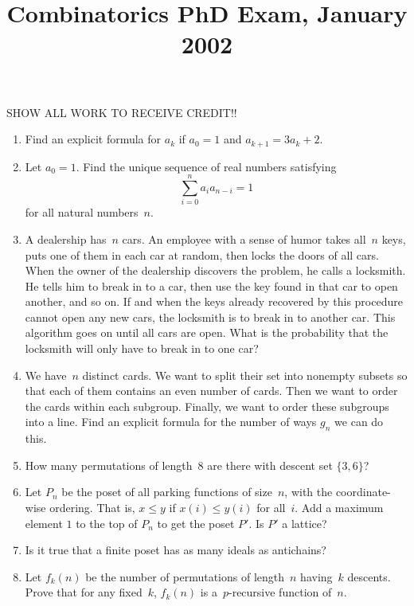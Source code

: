 \documentclass[11pt,letterpaper]{article}
\title{Combinatorics PhD Exam, January 2002}
\author{}
\date{}
\newenvironment{examproblems}[2]{%
  \def\ProblemHeadingTag{#2}%
  \AssignTaggingSocketPlug{block/list/label}{examproblem}%
  \begin{enumerate}%
  \setcounter{enumi}{#1}%
  \renewcommand{\labelenumi}{\textbf{\theenumi.}}%
  \setlength{\topsep}{0.35em}%
  \setlength{\partopsep}{0pt}%
  \setlength{\itemsep}{0.48em}%
  \setlength{\parsep}{0.18em}%
}{\end{enumerate}}
\newenvironment{examinstructions}{%
  \par\begingroup\itshape
}{%
  \par\endgroup\vspace{0.18em}
}
\begin{document}
\maketitle
\thispagestyle{empty}
\begin{examinstructions}
SHOW ALL WORK TO RECEIVE CREDIT!!
\end{examinstructions}
\begin{examproblems}{0}{H2}
\def\ProblemHeadingText{Problem 1.}
\item
Find an explicit formula for \(a_k\) if \(a_0=1\) and \(a_{k+1}=3a_k+2\).
\def\ProblemHeadingText{Problem 2.}
\item
Let \(a_0=1\). Find the unique sequence of real numbers satisfying
\[
\sum_{i=0}^{n} a_i a_{n-i}=1
\]
 for all natural numbers~\(n\).
\def\ProblemHeadingText{Problem 3.}
\item
A dealership has~\(n\) cars. An employee with a sense of humor takes all~\(n\) keys, puts one of them in each car at random, then locks the doors of all cars. When the owner of the dealership discovers the problem, he calls a locksmith. He tells him to break in to a car, then use the key found in that car to open another, and so on. If and when the keys already recovered by this procedure cannot open any new cars, the locksmith is to break in to another car. This algorithm goes on until all cars are open. What is the probability that the locksmith will only have to break in to one car?
\def\ProblemHeadingText{Problem 4.}
\item
We have~\(n\) distinct cards. We want to split their set into nonempty subsets so that each of them contains an even number of cards. Then we want to order the cards within each subgroup. Finally, we want to order these subgroups into a line. Find an explicit formula for the number of ways \(g_n\) we can do this.
\def\ProblemHeadingText{Problem 5.}
\item
How many permutations of length~\(8\) are there with descent set \(\{3,6\}\)?
\def\ProblemHeadingText{Problem 6.}
\item
Let \(P_n\) be the poset of all parking functions of size~\(n\), with the coordinate-wise ordering. That is, \(x\leq y\) if \(x(i)\leq y(i)\) for all~\(i\). Add a maximum element \(\hat{1}\) to the top of \(P_n\) to get the poset \(P'\). Is \(P'\) a lattice?
\def\ProblemHeadingText{Problem 7.}
\item
Is it true that a finite poset has as many ideals as antichains?
\def\ProblemHeadingText{Problem 8.}
\item
Let \(f_k(n)\) be the number of permutations of length~\(n\) having~\(k\) descents. Prove that for any fixed~\(k\), \(f_k(n)\) is a~\(p\)-recursive function of~\(n\).

\end{examproblems}
\end{document}
